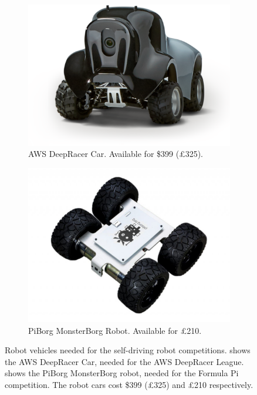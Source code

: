 \documentclass{l4proj}
\begin{document}
\begin{figure}[!h]
    \centering
    \begin{subfigure}[b]{0.44\textwidth}
        \includegraphics[width=\textwidth]{images/DeepRacer.pdf}
        \caption{AWS DeepRacer Car. Available for \$399 (£325).}
        \label{fig:deepcar}
    \end{subfigure}
    \quad
    \begin{subfigure}[b]{0.44\textwidth}
        \includegraphics[width=\textwidth]{images/piborg.pdf}
        \caption{PiBorg MonsterBorg Robot. Available for £210.}
        \label{fig:piborg-car}
    \end{subfigure}   
    \caption{Robot vehicles needed for the self-driving robot competitions.  shows the AWS DeepRacer Car, needed for the AWS DeepRacer League.  shows the PiBorg MonsterBorg robot, needed for the Formula Pi competition. The robot cars cost \$399 (£325) and £210 respectively.
    }\label{fig:robot-cars}
\end{figure}
\end{document}
